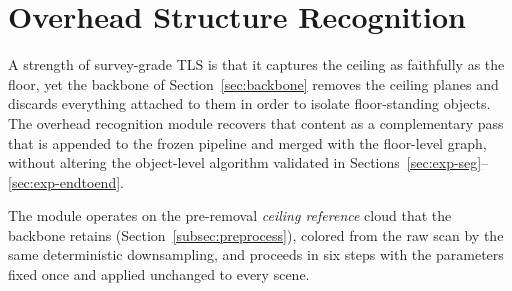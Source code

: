 \section{Overhead Structure Recognition}
\label{sec:overhead}

A strength of survey-grade TLS is that it captures the ceiling as faithfully
as the floor, yet the backbone of Section~\ref{sec:backbone} removes the
ceiling planes and discards everything attached to them in order to isolate
floor-standing objects. The overhead recognition module recovers that
content as a complementary pass that is appended to the frozen pipeline and
merged with the floor-level graph, without altering the object-level
algorithm validated in Sections~\ref{sec:exp-seg}--\ref{sec:exp-endtoend}.

The module operates on the pre-removal \emph{ceiling reference} cloud that
the backbone retains (Section~\ref{subsec:preprocess}), colored from the raw
scan by the same deterministic downsampling, and proceeds in six steps with
the parameters fixed once and applied unchanged to every scene.

